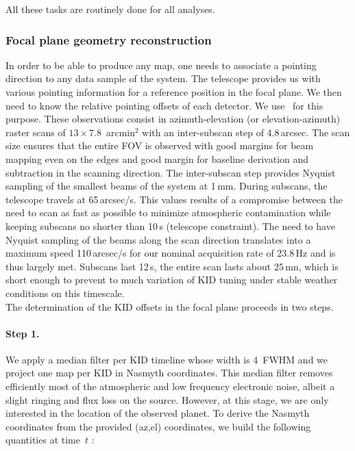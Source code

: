 All these tasks are routinely done for all analyses.

\subsubsection{Focal plane geometry reconstruction}
\label{se:fov_first_geometry}

In order to be able to produce any map, one needs to associate a pointing
direction to any data sample of the system. The telescope provides us with
various pointing information for a reference position in the focal plane. We
then need to know the relative pointing offsets of each detector. We use \bms\
for this purpose. These observations consist in azimuth-elevation (or
elevation-azimuth) raster scans of $13\times7.8$~arcmin$^2$ with an
inter-subscan step of 4.8\,arcsec. The scan size ensures that the entire FOV is
observed with good margins for beam mapping even on the edges and good margin
for baseline derivation and subtraction in the scanning direction. The
inter-subscan step provides Nyquist sampling of the smallest beams of the system
at 1\,mm. During subscans, the telescope travels at 65\,arcsec/s. This values
results of a compromise between the need to scan as fast as possible to minimize
atmospheric contamination while keeping subscans no shorter than 10\,s
(telescope constraint). The need to have Nyquist sampling of the beams along the
scan direction translates into a maximum speed 110\,arcsec/s for our nominal
acquisition rate of 23.8\,Hz and is thus largely met. Subscans last 12\,s, the
entire scan lasts about 25\,mn, which is short enough to prevent to much
variation of KID tuning under stable weather conditions on this timescale.\\

The determination of the KID offsets in the focal plane proceeds in two steps.

\paragraph{Step 1.} We apply a median filter per
KID timeline whose width is 4~FWHM and we project one map per KID in Nasmyth
coordinates. This median filter removes efficiently most of the atmospheric and low frequency
electronic noise, albeit a slight ringing and flux loss on the
source. However, at this stage, we are only interested in the location of the
observed planet. To derive the Nasmyth coordinates from the provided (az,el)
coordinates, we build the following quantities at time~$t$ :

